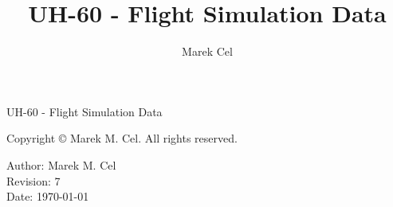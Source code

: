 \documentclass[12pt,a4paper]{article}
\title{UH-60 - Flight Simulation Data}
\author{Marek Cel}
\date{}
\begin{document}
  
  \begin{titlepage}
    \centering
    {\huge UH-60 - Flight Simulation Data\par}
  \end{titlepage}
  

  \noindent Copyright \copyright{} \the\year{} Marek M. Cel. All rights reserved.

  \noindent Author: Marek M. Cel \\
  Revision: 7 \\
  Date: \today

  
  
  
  {
    \clearpage
    \setlength{\parskip}{0em}
    \tableofcontents
  }

  
  
  
  
  
  
  \clearpage
   
  
  
\end{document}

